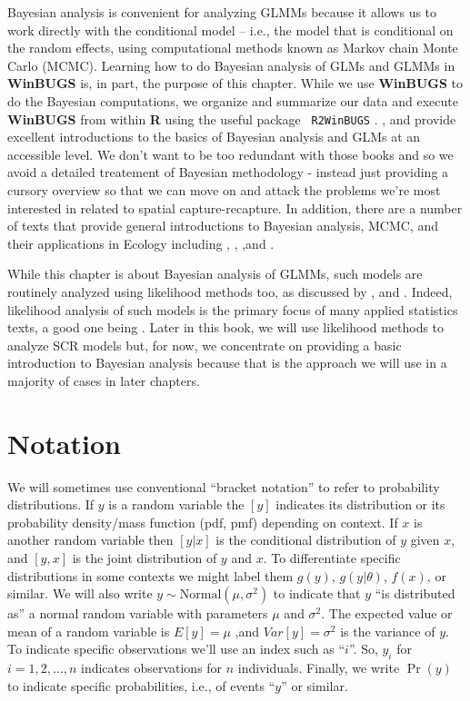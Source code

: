Bayesian analysis is convenient for analyzing GLMMs because it allows
us to work directly with the conditional model -- i.e., the model that
is conditional on the random effects, using computational methods
known as Markov chain Monte Carlo (MCMC). Learning how to do Bayesian
analysis of GLMs and GLMMs in {\bf WinBUGS} is, in part, the purpose
of this chapter.  While we use {\bf WinBUGS} to do the Bayesian
computations, we organize and summarize our data and execute {\bf
  WinBUGS} from within {\bf R} using the useful package \mbox{\tt
  R2WinBUGS} \citep{sturtz_etal:2005}.  \citet{kery:2010}, and
\citet{kery_schaub:2011} provide excellent introductions to the basics
of Bayesian analysis and GLMs at an accessible level. We don't want to
be too redundant with those books and so we avoid a detailed
treatement of Bayesian methodology - instead just providing a cursory
overview so that we can move on and attack the problems we're most
interested in related to spatial capture-recapture.  In addition,
there are a number of texts that provide general introductions to
Bayesian analysis, MCMC, and their applications in Ecology including
\citet{mccarthy:2007}, \citet{kery:2010}, \citet{link_barker:2009},and
\citet{king_etal:2009}.


While this chapter is about Bayesian analysis of GLMMs, such models
are routinely analyzed using likelihood methods too, as discussed by
\citet{royle_dorazio:2008}, and \citet{kery:2010}. Indeed, likelihood
analysis of such models is the primary focus of many applied
statistics texts, a good one being \citet{zuur_etal:2009}. Later in
this book, we will use likelihood methods to analyze SCR models but,
for now, we concentrate on providing a basic introduction to Bayesian
analysis because that is the approach we will use in a majority of
cases in later chapters.


\section{ Notation}

We will sometimes use conventional ``bracket notation''  to refer to
probability distributions. If $y$ is a random variable the $[y]$
indicates its distribution or its probability density/mass function
(pdf, pmf) depending on context. If $x$ is another random variable
then $[y|x]$ is the conditional distribution of $y$ given $x$, and
$[y,x]$ is the joint distribution of $y$ and $x$. To differentiate
specific distributions in some contexts we might label them $g(y)$,
$g(y|\theta)$, $f(x)$, or similar. We will also write $y \sim
\mbox{Normal}(\mu,\sigma^{2})$ to indicate that $y$ ``is distributed as'' a normal
random variable with parameters $\mu$ and $\sigma^{2}$. The expected value
or mean of a random variable is $E[y] = \mu$ ,and $Var[y] = \sigma^{2}$ is
the variance of $y$.  To indicate specific observations we'll use an
index such as ``$i$''. So, $y_{i}$ for $i=1,2,\ldots,n$ indicates
observations for $n$ individuals. Finally, we write $\Pr(y)$ to indicate specific probabilities, i.e., of events ``$y$'' or similar.


